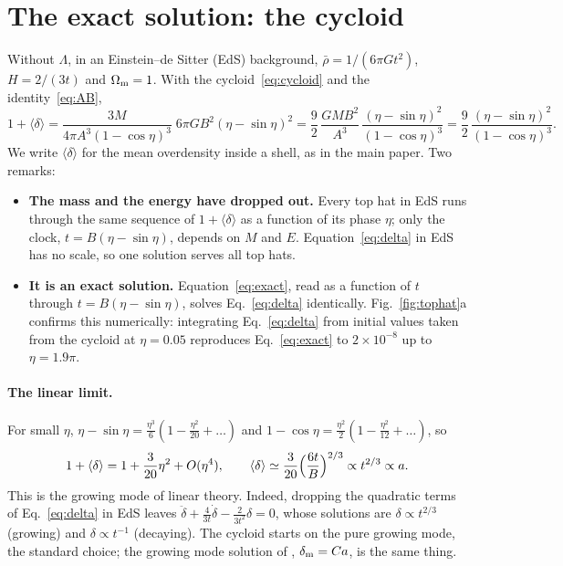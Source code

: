 \documentclass[11pt,a4paper]{article}
\newcommand{\md}{\langle\delta\rangle}
\begin{document}
\section{The exact solution: the cycloid}\label{sec:cycloid}

Without $\Lambda$, in an Einstein--de Sitter (EdS) background,
$\bar\rho=1/(6\pi Gt^{2})$, $H=2/(3t)$ and $\Omega_{\rm m}=1$. With the
cycloid~\eqref{eq:cycloid} and the identity~\eqref{eq:AB},
\begin{equation}
  1+\md=\frac{3M}{4\pi A^{3}(1-\cos\eta)^{3}}\;6\pi G B^{2}(\eta-\sin\eta)^{2}
  =\frac92\,\frac{GMB^{2}}{A^{3}}\,\frac{(\eta-\sin\eta)^{2}}{(1-\cos\eta)^{3}}
  =\frac92\,\frac{(\eta-\sin\eta)^{2}}{(1-\cos\eta)^{3}} .
  \label{eq:exact}
\end{equation}
We write $\md$ for the mean overdensity inside a shell, as in the main
paper. Two remarks:
\begin{itemize}
\item \textbf{The mass and the energy have dropped out.} Every top hat in
EdS runs through the same sequence of $1+\md$ as a function of its
phase $\eta$; only the clock, $t=B(\eta-\sin\eta)$, depends on $M$ and
$E$. Equation~\eqref{eq:delta} in EdS has no scale, so one solution
serves all top hats.
\item \textbf{It is an exact solution.} Equation~\eqref{eq:exact}, read as
a function of $t$ through $t=B(\eta-\sin\eta)$, solves
Eq.~\eqref{eq:delta} identically. Fig.~\ref{fig:tophat}a confirms this
numerically: integrating Eq.~\eqref{eq:delta} from initial values taken
from the cycloid at $\eta=0.05$ reproduces Eq.~\eqref{eq:exact} to
$2\times10^{-8}$ up to $\eta=1.9\pi$.
\end{itemize}

\paragraph{The linear limit.} For small $\eta$,
$\eta-\sin\eta=\frac{\eta^{3}}{6}(1-\frac{\eta^{2}}{20}+\dots)$ and
$1-\cos\eta=\frac{\eta^{2}}{2}(1-\frac{\eta^{2}}{12}+\dots)$, so
\begin{equation}
  1+\md=1+\frac{3}{20}\eta^{2}+O(\eta^{4}),\qquad
  \md\simeq\frac{3}{20}\Bigl(\frac{6t}{B}\Bigr)^{2/3}\propto t^{2/3}\propto a .
  \label{eq:linear}
\end{equation}
This is the growing mode of linear theory. Indeed, dropping the
quadratic terms of Eq.~\eqref{eq:delta} in EdS leaves
$\ddot\delta+\frac{4}{3t}\dot\delta-\frac{2}{3t^{2}}\delta=0$, whose
solutions are $\delta\propto t^{2/3}$ (growing) and $\delta\propto t^{-1}$
(decaying). The cycloid starts on the pure growing mode, the standard
choice; the growing mode solution of \citet[their eq.~19]{Herrera2019},
$\delta_{\rm m}=Ca$, is the same thing.
\end{document}
